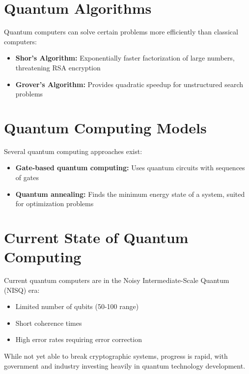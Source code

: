 
\section{Quantum Algorithms}
Quantum computers can solve certain problems more efficiently than classical computers:

\begin{itemize}
    \item \textbf{Shor's Algorithm:} Exponentially faster factorization of large numbers, threatening RSA encryption
    
    \item \textbf{Grover's Algorithm:} Provides quadratic speedup for unstructured search problems
\end{itemize}


\section{Quantum Computing Models}
Several quantum computing approaches exist:

\begin{itemize}
    \item \textbf{Gate-based quantum computing:} Uses quantum circuits with sequences of gates
    
    \item \textbf{Quantum annealing:} Finds the minimum energy state of a system, suited for optimization problems
\end{itemize}

\section{Current State of Quantum Computing}
Current quantum computers are in the Noisy Intermediate-Scale Quantum (NISQ) era:

\begin{itemize}
    \item Limited number of qubits (50-100 range)
    \item Short coherence times
    \item High error rates requiring error correction
\end{itemize}

While not yet able to break cryptographic systems, progress is rapid, with government and industry investing heavily in quantum technology development.